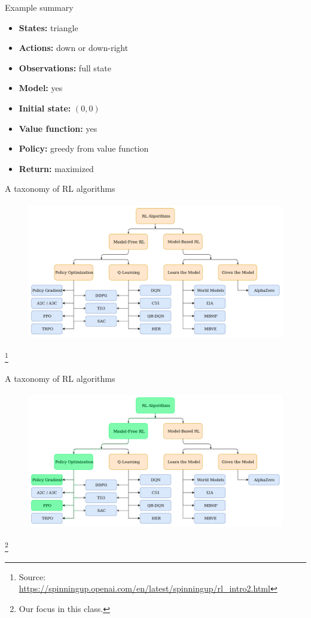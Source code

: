 \documentclass[11pt, aspectratio=169]{beamer}
\newcommand\blfootnote[1]{%
  \begingroup
  \renewcommand\thefootnote{}%
  \footnote{#1}%
  \addtocounter{footnote}{-1}%
  \endgroup
}
\begin{document}
\begin{frame}{Example summary}
    \begin{itemize}
        \item \textbf{States:} triangle
        \item \textbf{Actions:} down or down-right
        \item \textbf{Observations:} full state
        \item \textbf{Model:} yes
        \item \textbf{Initial state:} $(0, 0)$
        \item \textbf{Value function:} yes
        \item \textbf{Policy:} greedy from value function
        \item \textbf{Return:} maximized
    \end{itemize}
\end{frame}

\begin{frame}{A taxonomy of RL algorithms}
    \begin{figure}
        \includegraphics[height=6cm]{figures/taxonomy.png}
    \end{figure}
    \blfootnote{
        Source: \url{https://spinningup.openai.com/en/latest/spinningup/rl_intro2.html}
    }
\end{frame}

\begin{frame}{A taxonomy of RL algorithms}
    \begin{figure}
        \includegraphics[height=6cm]{figures/taxonomy-focus.png}
    \end{figure}
    \blfootnote{
        Our focus in this class.
    }
\end{frame}
\end{document}
